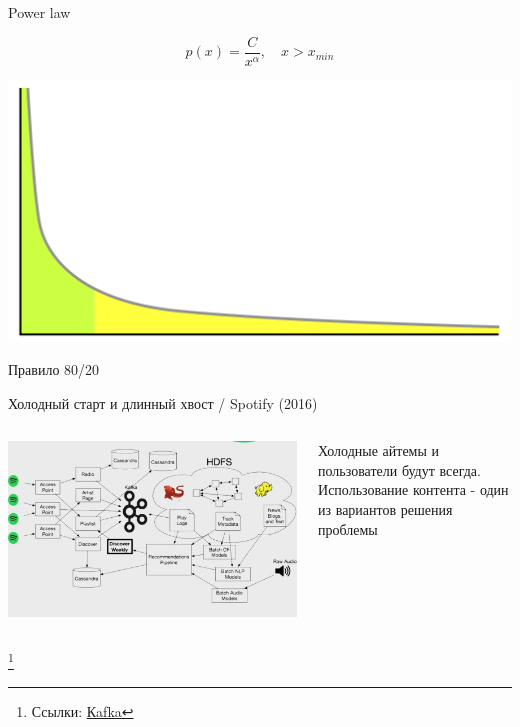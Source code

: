 \documentclass[11pt,aspectratio=169]{beamer}
\begin{document}
\begin{frame}{Power law}

\[
p(x) = \frac{C} {x^{\alpha}}, \quad x > x_{min}
\]

\begin{center}
\includegraphics[scale=0.25]{images/longtail.png}

Правило 80/20
\end{center}

\end{frame}

\begin{frame}{Холодный старт и длинный хвост / Spotify (2016) \cite{SPTF}}
\begin{columns}
\begin{column}{0.6\textwidth}
   \begin{center}
		\includegraphics[scale=0.31]{images/spotify.jpeg}
   \end{center}
\end{column}
\begin{column}{0.35\textwidth}
\begin{small}
    \begin{tcolorbox}[colback=info!5,colframe=info!80,title=]
    Холодные айтемы и пользователи будут всегда. Использование контента - один из вариантов решения проблемы
    \end{tcolorbox}
\end{small}
\end{column}
\end{columns}

\footnote{Ссылки:
\href{https://kafka.apache.org/}{Кafka}
}

\end{frame}
\end{document}

